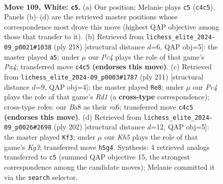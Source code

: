 \documentclass[11pt]{article}
\begin{document}
\clearpage

\begin{figure}[p]\centering
\begin{subfigure}{0.46\textwidth}\centering
\resizebox{\linewidth}{!}{%
\newchessgame
\chessboard[
  setfen={B1n5/6k1/8/6PK/2P4P/8/8/8 w - - 1 109},
  showmover=false,
  pgfstyle=straightmove, color=movearrow, markmove={c4-c5}
]}
\caption{}
\end{subfigure}\hfill
\begin{subfigure}{0.46\textwidth}\centering
\resizebox{\linewidth}{!}{%
\newchessgame
\chessboard[
  setfen={8/8/2k5/8/PPK5/2P5/8/8 w - - 1 110},
  showmover=false,
  pgfstyle=straightmove, color=movearrow, markmove={a4-a5}
]}
\caption{}
\end{subfigure}
\\[4pt]
\begin{subfigure}{0.46\textwidth}\centering
\resizebox{\linewidth}{!}{%
\newchessgame
\chessboard[
  setfen={3r4/8/R7/5p2/5k2/5p2/8/5K2 b - - 69 106},
  showmover=false,
  pgfstyle=straightmove, color=movearrow, markmove={d8-e8}
]}
\caption{}
\end{subfigure}\hfill
\begin{subfigure}{0.46\textwidth}\centering
\resizebox{\linewidth}{!}{%
\newchessgame
\chessboard[
  setfen={8/8/8/6k1/8/6KP/6P1/8 w - - 2 102},
  showmover=false,
  pgfstyle=straightmove, color=movearrow, markmove={g3-f3}
]}
\caption{}
\end{subfigure}
\caption{\textbf{Move 109, White: \texttt{c5}.} (a) Our position; Melanie plays \texttt{c5} (\texttt{c4c5}). Panels (b)--(d) are the retrieved master positions whose correspondence most drove this move (highest QAP objective among those that transfer to it). (b) Retrieved from \texttt{lichess\_elite\_2024-09\_p0021\#1038} (ply 218) [structural distance $d$=6, QAP obj=5]: the master played \texttt{a5}; under $\mu$ our \emph{Pc4} plays the role of that game's \emph{Pa4}; transferred move \texttt{c4c5} \textbf{(endorses this move)}. (c) Retrieved from \texttt{lichess\_elite\_2024-09\_p0003\#1787} (ply 211) [structural distance $d$=9, QAP obj=4]: the master played \texttt{Re8}; under $\mu$ our \emph{Pc4} plays the role of that game's \emph{Rd1} (a \textbf{cross-type} correspondence); cross-type roles: our \emph{B}a8 as their \emph{r}a6; transferred move \texttt{c4c5} \textbf{(endorses this move)}. (d) Retrieved from \texttt{lichess\_elite\_2024-09\_p0026\#2698} (ply 202) [structural distance $d$=12, QAP obj=5]: the master played \texttt{Kf3}; under $\mu$ our \emph{Kh5} plays the role of that game's \emph{Kg3}; transferred move \texttt{h5g4}. Synthesis: 4 retrieved analogs transferred to \texttt{c5} (summed QAP objective 15, the strongest correspondence among the candidate moves); Melanie committed it via the \texttt{search} selector.}
\label{fig:thought-m216}
\end{figure}
\end{document}
